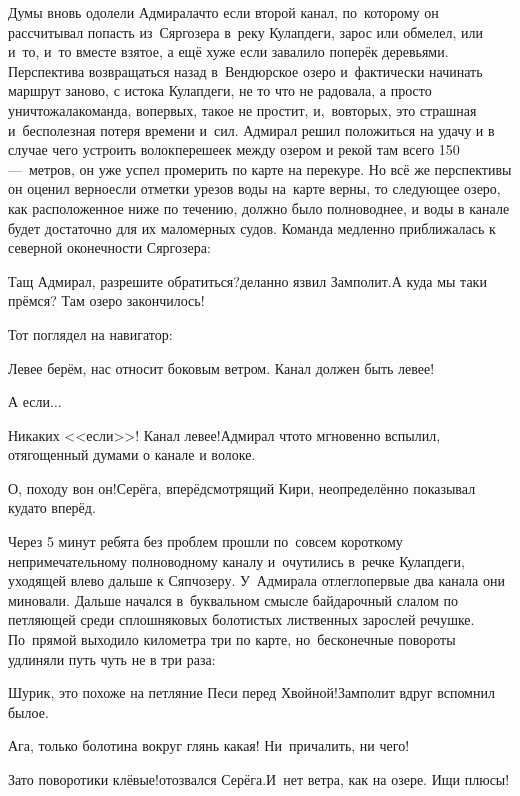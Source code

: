 Думы вновь одолели Адмирала\mdash что если второй канал, по~которому он рассчитывал попасть из~Сяргозера в~реку Кулапдеги, зарос или обмелел, или и~то, и~то вместе взятое, а ещё хуже если завалило поперёк деревьями. Перспектива возвращаться назад в~Вендюрское озеро и~фактически начинать маршрут заново, с истока Кулапдеги, не то что не радовала, а просто уничтожала\mdash команда, во\sdash первых, такое не простит, и,~во\sdash вторых, это страшная и~бесполезная потеря времени и~сил. Адмирал решил положиться на удачу и в случае чего устроить волок\mdash перешеек между озером и рекой там всего 150\thinspace\nobreakdash---~метров, он уже успел промерить по карте на перекуре. Но всё же перспективы он оценил верно\mdash если отметки урезов воды на~карте верны, то следующее озеро, как расположенное ниже по течению, должно было полноводнее, и воды в канале будет достаточно для их маломерных судов. Команда медленно приближалась к северной оконечности Сяргозера:

\diagdash Тащ Адмирал, разрешите обратиться?\mdash деланно язвил Замполит.\mdash А куда мы таки прёмся? Там озеро закончилось!

Тот поглядел на навигатор:

\diagdash Левее берём, нас относит боковым ветром. Канал должен быть левее!

\diagdash А если$\ldots$

\diagdash Никаких <<если>>! Канал левее!\mdash Адмирал что\sdash то мгновенно вспылил, отягощенный думами о канале и волоке.

\diagdash О, походу вон он!\mdash Серёга, вперёдсмотрящий Кири, неопределённо показывал куда\sdash то вперёд.

Через 5 минут ребята без проблем прошли по~совсем короткому непримечательному полноводному каналу и~очутились в~речке Кулапдеги, уходящей влево дальше к Сяпчозеру. У~Адмирала отлегло\mdash первые два канала они миновали. Дальше начался в~буквальном смысле байдарочный слалом по петляющей среди сплошняковых болотистых лиственных зарослей речушке. По~прямой выходило километра три по карте, но~бесконечные повороты удлиняли путь чуть не в три раза:

\diagdash Шурик, это похоже на петляние Песи перед Хвойной!\mdash Замполит вдруг вспомнил былое.

\diagdash Ага, только болотина вокруг глянь какая! Ни~причалить, ни чего!

\diagdash Зато поворотики клёвые!\mdash отозвался Серёга.\mdash И~нет ветра, как на озере. Ищи плюсы!

